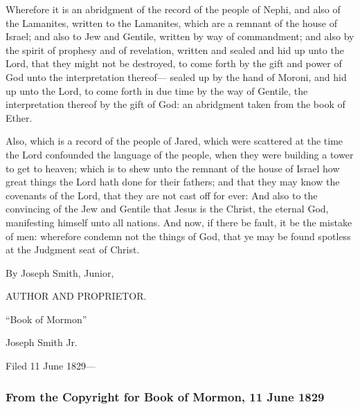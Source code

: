 		Wherefore it is an abridgment of the record of the people of Nephi, and also of the Lamanites, written to the Lamanites, which are a remnant of the house of Israel; and also to Jew and Gentile, written by way of commandment; and also by the spirit of prophesy and of revelation, written and sealed and hid up unto the Lord, that they might not be destroyed, to come forth by the gift and power of God unto the interpretation thereof--- sealed up by the hand of Moroni, and hid up unto the Lord, to come forth in due time by the way of Gentile, the interpretation thereof by the gift of God: an abridgment taken from the book of Ether.

		Also, which is a record of the people of Jared, which were scattered at the time the Lord confounded the language of the people, when they were building a tower to get to heaven; which is to shew unto the remnant of the house of Israel how great things the Lord hath done for their fathers; and that they may know the covenants of the Lord, that they are not cast off for ever: And also to the convincing of the Jew and Gentile that Jesus is the Christ, the eternal God, manifesting himself unto all nations. And now, if there be fault, it be the mistake of men: wherefore condemn not the things of God, that ye may be found spotless at the Judgment seat of Christ.

		\begin{tightcenter}
			By Joseph Smith, Junior,

			AUTHOR AND PROPRIETOR.
		\end{tightcenter}

		``Book of Mormon''

		Joseph Smith Jr.

		Filed 11 June 1829---
		
	\subsubsection{From the Copyright for Book of Mormon, 11 June 1829}
	

